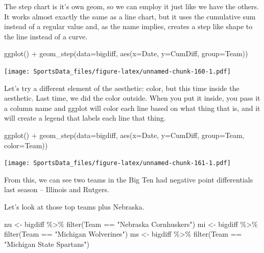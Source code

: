 \documentclass[
]{book}
\newenvironment{Shaded}{\begin{snugshade}}{\end{snugshade}}
\newcommand{\AttributeTok}[1]{\textcolor[rgb]{0.77,0.63,0.00}{#1}}
\newcommand{\FunctionTok}[1]{\textcolor[rgb]{0.00,0.00,0.00}{#1}}
\newcommand{\NormalTok}[1]{#1}
\newcommand{\OtherTok}[1]{\textcolor[rgb]{0.56,0.35,0.01}{#1}}
\newcommand{\SpecialCharTok}[1]{\textcolor[rgb]{0.00,0.00,0.00}{#1}}
\newcommand{\StringTok}[1]{\textcolor[rgb]{0.31,0.60,0.02}{#1}}
\begin{document}
The step chart is it's own geom, so we can employ it just like we have the others. It works almost exactly the same as a line chart, but it uses the cumulative sum instead of a regular value and, as the name implies, creates a step like shape to the line instead of a curve.

\begin{Shaded}
\begin{Highlighting}[]
\FunctionTok{ggplot}\NormalTok{() }\SpecialCharTok{+} \FunctionTok{geom\_step}\NormalTok{(}\AttributeTok{data=}\NormalTok{bigdiff, }\FunctionTok{aes}\NormalTok{(}\AttributeTok{x=}\NormalTok{Date, }\AttributeTok{y=}\NormalTok{CumDiff, }\AttributeTok{group=}\NormalTok{Team))}
\end{Highlighting}
\end{Shaded}

\texttt{[image: SportsData\_files/figure-latex/unnamed-chunk-160-1.pdf]}

Let's try a different element of the aesthetic: color, but this time inside the aesthetic. Last time, we did the color outside. When you put it inside, you pass it a column name and ggplot will color each line based on what thing that is, and it will create a legend that labels each line that thing.

\begin{Shaded}
\begin{Highlighting}[]
\FunctionTok{ggplot}\NormalTok{() }\SpecialCharTok{+} \FunctionTok{geom\_step}\NormalTok{(}\AttributeTok{data=}\NormalTok{bigdiff, }\FunctionTok{aes}\NormalTok{(}\AttributeTok{x=}\NormalTok{Date, }\AttributeTok{y=}\NormalTok{CumDiff, }\AttributeTok{group=}\NormalTok{Team, }\AttributeTok{color=}\NormalTok{Team))}
\end{Highlighting}
\end{Shaded}

\texttt{[image: SportsData\_files/figure-latex/unnamed-chunk-161-1.pdf]}

From this, we can see two teams in the Big Ten had negative point differentials last season -- Illinois and Rutgers.

Let's look at those top teams plus Nebraska.

\begin{Shaded}
\begin{Highlighting}[]
\NormalTok{nu }\OtherTok{\textless{}{-}}\NormalTok{ bigdiff }\SpecialCharTok{\%\textgreater{}\%} \FunctionTok{filter}\NormalTok{(Team }\SpecialCharTok{==} \StringTok{"Nebraska Cornhuskers"}\NormalTok{)}
\NormalTok{mi }\OtherTok{\textless{}{-}}\NormalTok{ bigdiff }\SpecialCharTok{\%\textgreater{}\%} \FunctionTok{filter}\NormalTok{(Team }\SpecialCharTok{==} \StringTok{"Michigan Wolverines"}\NormalTok{)}
\NormalTok{ms }\OtherTok{\textless{}{-}}\NormalTok{ bigdiff }\SpecialCharTok{\%\textgreater{}\%} \FunctionTok{filter}\NormalTok{(Team }\SpecialCharTok{==} \StringTok{"Michigan State Spartans"}\NormalTok{)}
\end{Highlighting}
\end{Shaded}
\end{document}
